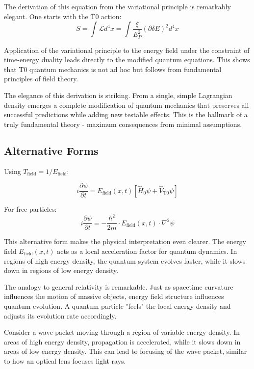 \documentclass[12pt,a4paper]{article}
\newcommand{\deltaE}{\delta E}
\newcommand{\xipar}{\xi}
\newcommand{\EPlanck}{E_P}
\theoremstyle{definition}
\theoremstyle{remark}
\begin{document}
The derivation of this equation from the variational principle is remarkably elegant. One starts with the T0 action:
$$S = \int \mathcal{L} d^4x = \int \frac{\xipar}{\EPlanck^2} (\partial \deltaE)^2 d^4x$$

Application of the variational principle to the energy field under the constraint of time-energy duality leads directly to the modified quantum equations. This shows that T0 quantum mechanics is not ad hoc but follows from fundamental principles of field theory.

The elegance of this derivation is striking. From a single, simple Lagrangian density emerges a complete modification of quantum mechanics that preserves all successful predictions while adding new testable effects. This is the hallmark of a truly fundamental theory - maximum consequences from minimal assumptions.

\subsection{Alternative Forms}

Using $T_{\text{field}} = 1/E_{\text{field}}$:

\begin{equation}
	\boxed{i \frac{\partial\psi}{\partial t} = E_{\text{field}}(x,t) \left[\hat{H}_0 \psi + \hat{V}_{\text{T0}} \psi\right]}
	\label{eq:t0_schrodinger_energy}
\end{equation}

For free particles:
\begin{equation}
	\boxed{i \frac{\partial\psi}{\partial t} = -\frac{\hbar^2}{2m} \cdot E_{\text{field}}(x,t) \cdot \nabla^2 \psi}
	\label{eq:t0_schrodinger_free}
\end{equation}

This alternative form makes the physical interpretation even clearer. The energy field $E_{\text{field}}(x,t)$ acts as a local acceleration factor for quantum dynamics. In regions of high energy density, the quantum system evolves faster, while it slows down in regions of low energy density.

The analogy to general relativity is remarkable. Just as spacetime curvature influences the motion of massive objects, energy field structure influences quantum evolution. A quantum particle "feels" the local energy density and adjusts its evolution rate accordingly.

Consider a wave packet moving through a region of variable energy density. In areas of high energy density, propagation is accelerated, while it slows down in areas of low energy density. This can lead to focusing of the wave packet, similar to how an optical lens focuses light rays.
\end{document}
